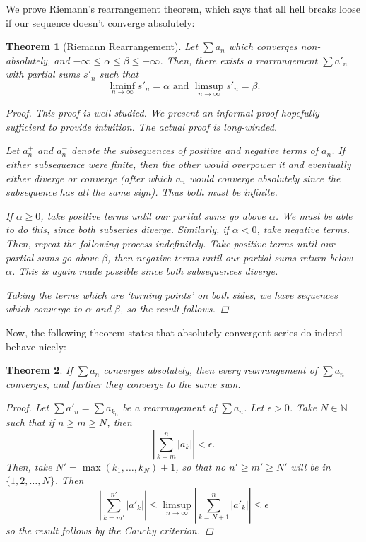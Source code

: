 \documentclass{scrbook}
\newcommand{\N}{\mathbb{N}}
\renewcommand{\to}{\rightarrow}
\newtheorem{theorem}{Theorem}
\begin{document}
We prove Riemann's rearrangement theorem, which says that all hell breaks loose if our sequence doesn't converge absolutely:
\begin{theorem}[Riemann Rearrangement] %
Let $\sum a_n$ which converges non-absolutely, and $-\infty \le \alpha \le \beta \le +\infty$. Then, there exists a rearrangement $\sum a'_n$ with partial sums $s'_n$ such that
\[
	\liminf_{n \to \infty} s'_n = \alpha \text{ and } \limsup_{n \to \infty} s'_n = \beta.
\]

\begin{proof}
This proof is well-studied. We present an informal proof hopefully sufficient to provide intuition. The actual proof is long-winded.

Let $a^+_n$ and $a^-_n$ denote the subsequences of positive and negative terms of $a_n$. If either subsequence were finite, then the other would overpower it and eventually either diverge or converge (after which $a_n$ would converge absolutely since the subsequence has all the same sign). Thus both must be infinite.

If $\alpha \ge 0$, take positive terms until our partial sums go above $\alpha$. We must be able to do this, since both subseries diverge. Similarly, if $\alpha < 0$, take negative terms. Then, repeat the following process indefinitely. Take positive terms until our partial sums go above $\beta$, then negative terms until our partial sums return below $\alpha$. This is again made possible since both subsequences diverge. 

Taking the terms which are `turning points' on both sides, we have sequences which converge to $\alpha$ and $\beta$, so the result follows.
\end{proof}
\end{theorem}

Now, the following theorem states that absolutely convergent series do indeed behave nicely:
\begin{theorem} %
If $\sum a_n$ converges absolutely, then every rearrangement of $\sum a_n$ converges, and further they converge to the same sum.

\begin{proof}
Let $\sum a'_n = \sum a_{k_n}$ be a rearrangement of $\sum a_n$. Let $\epsilon > 0$. Take $N \in \N$ such that if $n \ge m \ge N$, then
\[
	\left|\sum_{k=m}^{n} |a_k| \right| < \epsilon.
\]
Then, take $N' = \max(k_1, \dotsc, k_N) + 1$, so that no $n' \ge m' \ge N'$ will be in $\{1, 2, \dotsc, N\}$. Then
\[
	\left|\sum_{k=m'}^{n'} |a'_k| \right| \le \limsup_{n \to \infty} \left|\sum_{k=N+1}^{n} |a'_k| \right| \le \epsilon
\]
so the result follows by the Cauchy criterion.
\end{proof}
\end{theorem}
\end{document}
